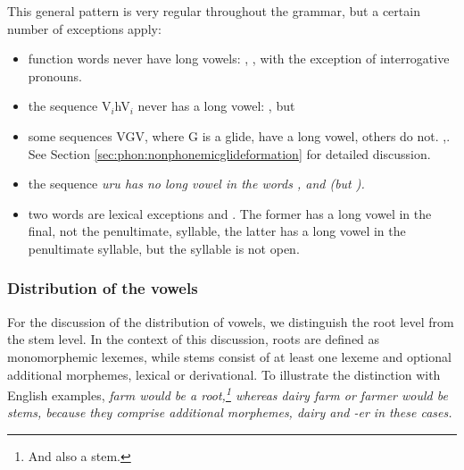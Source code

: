 This general pattern is very regular throughout the grammar, but a certain number of exceptions apply:

\begin{itemize}
 \item function words never have long vowels: , , with the exception of interrogative pronouns.
\item the sequence V$_i$hV$_i$ never has a long vowel: , but 
\item some sequences VGV, where G is a glide, have a long vowel, others do not. ,. See Section \ref{sec:phon:nonphonemicglideformation} for detailed discussion.
\item the sequence \em uru \em has no long vowel in the words ,  and  (but ).
\item two words are lexical exceptions  and . The former has a long vowel in the final, not the penultimate, syllable, the latter has a long vowel in the penultimate syllable, but the syllable is not open.
\end{itemize}




% 
% 

\subsubsection{Distribution of the vowels}\label{sec:phon:Distributionofthevowels}
For the discussion of the distribution of vowels, we distinguish the root level from the stem level. In the context of this discussion, roots are defined as monomorphemic lexemes, while stems consist of at least one lexeme and optional additional morphemes, lexical or derivational. To illustrate the distinction with English examples, \em farm \em would be a root,\footnote{And also a stem.} whereas \em dairy farm \em or \em farmer \em would be stems, because they comprise additional morphemes, \em dairy \em and \em -er \em in these cases.

